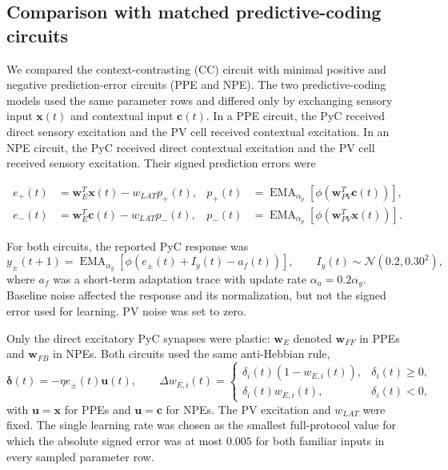 \subsection{Comparison with matched predictive-coding circuits}
\label{s:predictive-coding-comparison}

We compared the context-contrasting (CC) circuit with minimal positive and
negative prediction-error circuits (PPE and NPE). The two predictive-coding
models used the same parameter rows and differed only by exchanging sensory
input $\mathbf{x}(t)$ and contextual input $\mathbf{c}(t)$. In a PPE circuit,
the PyC received direct sensory excitation and the PV cell received contextual
excitation. In an NPE circuit, the PyC received direct contextual excitation and
the PV cell received sensory excitation. Their signed prediction errors were

\begin{align}
e_{+}(t) &= \mathbf{w}_{E}^{T}\mathbf{x}(t)
 - w_{LAT}p_{+}(t),
&p_{+}(t) &= \operatorname{EMA}_{\alpha_p}
 \!\left[\phi\!\left(\mathbf{w}_{PV}^{T}\mathbf{c}(t)\right)\right],\\
e_{-}(t) &= \mathbf{w}_{E}^{T}\mathbf{c}(t)
 - w_{LAT}p_{-}(t),
&p_{-}(t) &= \operatorname{EMA}_{\alpha_p}
 \!\left[\phi\!\left(\mathbf{w}_{PV}^{T}\mathbf{x}(t)\right)\right].
\end{align}

For both circuits, the reported PyC response was
\begin{equation}
y_{\pm}(t+1)=\operatorname{EMA}_{\alpha_y}
\left[\phi\left(e_{\pm}(t)+I_y(t)-a_f(t)\right)\right],
\qquad I_y(t)\sim\mathcal{N}(0.2,0.30^2),
\end{equation}
where $a_f$ was a short-term adaptation trace with update rate
$\alpha_a=0.2\alpha_y$. Baseline noise affected the response and its
normalization, but not the signed error used for learning. PV noise was set to
zero.

Only the direct excitatory PyC synapses were plastic: $\mathbf{w}_E$ denoted
$\mathbf{w}_{FF}$ in PPEs and $\mathbf{w}_{FB}$ in NPEs. Both circuits used the
same anti-Hebbian rule,
\begin{equation}
\boldsymbol{\delta}(t)=-\eta e_{\pm}(t)\mathbf{u}(t),\qquad
\Delta w_{E,i}(t)=
\begin{cases}
\delta_i(t)(1-w_{E,i}(t)), & \delta_i(t)\geq 0,\\
\delta_i(t)w_{E,i}(t), & \delta_i(t)<0,
\end{cases}
\end{equation}
with $\mathbf{u}=\mathbf{x}$ for PPEs and $\mathbf{u}=\mathbf{c}$ for NPEs.
The PV excitation and $w_{LAT}$ were fixed. The single learning rate was chosen
as the smallest full-protocol value for which the absolute signed error was at
most $0.005$ for both familiar inputs in every sampled parameter row.

